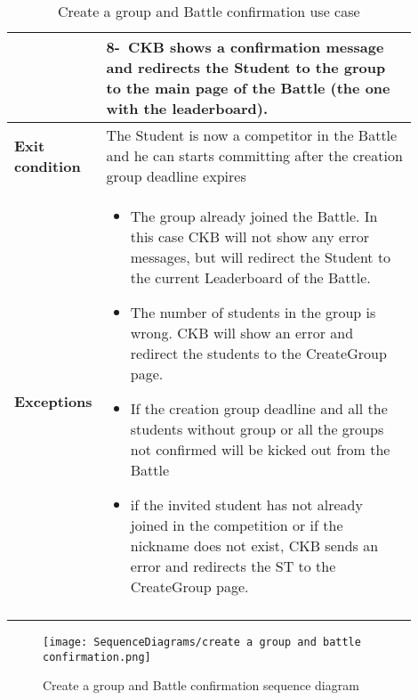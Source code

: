 \begin{center}
\begin{longtable}{|l|p{0.9\linewidth}|}
        & 8-\ CKB shows a confirmation message and redirects the Student to the group to the main page of the Battle (the one with the leaderboard).        \\
        \hline
        \textbf{Exit condition}   & The Student is now a competitor in the Battle and he can starts committing after the creation group deadline expires        \\
        \hline
        \textbf{Exceptions}        & \begin{itemize}
            \item The group already joined the Battle. In this case CKB will not show any error messages, but will redirect the Student to the current Leaderboard of the Battle.
            \item The number of students in the group is wrong. CKB will show an error and redirect the students to the CreateGroup page.
            \item If the creation group deadline and all the students without group or all the groups not confirmed will be kicked out from the Battle
            \item if the invited student has not already joined in the competition or if the nickname does not exist, CKB sends an error and redirects the ST to the CreateGroup page.
         \end{itemize}    \\
        \hline
        \caption{Create a group and Battle confirmation use case}
        \label{tab: create_a_group_and_Battle_confirmation_use_case}
    \end{longtable}
\end{center}

\begin{figure}[H]
    \begin{center}
        \texttt{[image: SequenceDiagrams/create a group and battle confirmation.png]}
        \caption{Create a group and Battle confirmation sequence diagram}
        \label{fig:create_a_group_and_battle_confirmation_seqd}%
    \end{center}
\end{figure}

